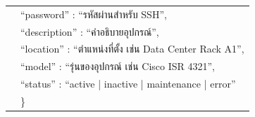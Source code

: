 \begin{table}[H]
\begin{tabularx}{\textwidth}{|l|L|}
                        & \hspace{1em} ``password'' : ``รหัสผ่านสำหรับ SSH'', \nonumber \\
                        & \hspace{1em} ``description'' : ``คำอธิบายอุปกรณ์'', \nonumber \\
                        & \hspace{1em} ``location'' : ``ตำแหน่งที่ตั้ง เช่น Data Center Rack A1'', \nonumber \\
                        & \hspace{1em} ``model'' : ``รุ่นของอุปกรณ์ เช่น Cisco ISR 4321'', \nonumber \\
                        & \hspace{1em} ``status'' : ``active | inactive | maintenance | error'' \nonumber \\
                        & \} \\
        \hline
    \end{tabularx}
\end{table}

